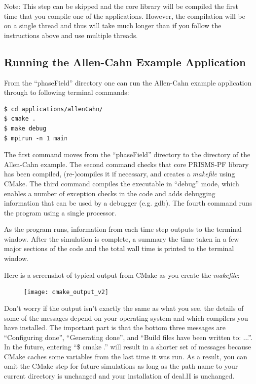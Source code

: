 \documentclass[10pt]{article} %
\begin{document}
Note: This step can be skipped and the core library will be compiled the first time that you compile one of the applications. However, the compilation will be on a single thread and thus will take much longer than if you follow the instructions above and use multiple threads.

\subsection{Running the Allen-Cahn Example Application} \label{allen_cahn_instructions}
From the ``phaseField'' directory one can run the Allen-Cahn example application through to following terminal commands:
\begin{lstlisting}
$ cd applications/allenCahn/ 
$ cmake . 
$ make debug 
$ mpirun -n 1 main 
\end{lstlisting}

The first command moves from the ``phaseField'' directory to the directory of the Allen-Cahn example. The second command checks that core PRISMS-PF library has been compiled, (re-)compiles it if necessary, and creates a \emph{makefile} using CMake. The third command compiles the executable in ``debug'' mode, which enables a number of exception checks in the code and adds debugging information that can be used by a debugger (e.g. gdb). The fourth command runs the program using a single processor.

As the program runs, information from each time step outputs to the terminal window. After the simulation is complete, a summary the time taken in a few major sections of the code and the total wall time is printed to the terminal window. 

Here is a screenshot of typical output from CMake as you create the \emph{makefile}:
\begin{figure}[H]
\vspace{-70pt}
\hspace{-2cm}
\texttt{[image: cmake\_output\_v2]}
\vspace{-70pt}
\end{figure}
Don't worry if the output isn't exactly the same as what you see, the details of some of the messages depend on your operating system and which compilers you have installed. The important part is that the bottom three messages are ``Configuring done'', ``Generating done'', and ``Build files have been written to: ...''. In the future, entering ``\$ cmake .'' will result in a shorter set of messages because CMake caches some variables from the last time it was run. As a result, you can omit the CMake step for future simulations as long as the path name to your current directory is unchanged and your installation of deal.II is unchanged.
\end{document}
